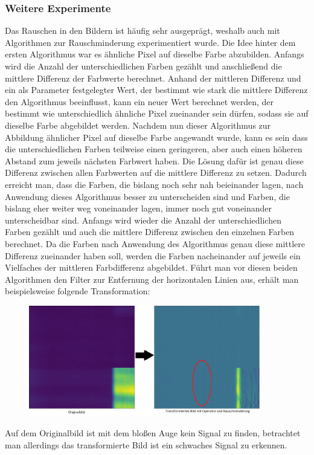 \documentclass[11pt, a4paper]{article}
\begin{document}
\subsubsection{Weitere Experimente}
Das Rauschen in den Bildern ist häufig sehr ausgeprägt, weshalb auch mit Algorithmen zur Rauschminderung experimentiert wurde. Die Idee hinter dem ersten Algorithmus war es ähnliche Pixel auf dieselbe Farbe abzubilden. Anfangs wird die Anzahl der unterschiedlichen Farben gezählt und anschließend die mittlere Differenz der Farbwerte berechnet. Anhand der mittleren Differenz und ein als Parameter festgelegter Wert, der bestimmt wie stark die mittlere Differenz den Algorithmus beeinflusst, kann ein neuer Wert berechnet werden, der bestimmt wie unterschiedlich ähnliche Pixel zueinander sein dürfen, sodass sie auf dieselbe Farbe abgebildet werden. 
\newline
Nachdem nun dieser Algorithmus zur Abbildung ähnlicher Pixel auf dieselbe Farbe angewandt wurde, kann es sein dass die unterschiedlichen Farben teilweise einen geringeren, aber auch einen höheren Abstand zum jeweils nächsten Farbwert haben. Die Lösung dafür ist genau diese Differenz zwischen allen Farbwerten auf die mittlere Differenz zu setzen. Dadurch erreicht man, dass die Farben, die bislang noch sehr nah beieinander lagen, nach Anwendung dieses Algorithmus besser zu unterscheiden sind und Farben, die bislang eher weiter weg voneinander lagen, immer noch gut voneinander unterscheidbar sind. Anfangs wird wieder die Anzahl der unterschiedlichen Farben gezählt und auch die mittlere Differenz zwischen den einzelnen Farben berechnet. Da die Farben nach Anwendung des Algorithmus genau diese mittlere Differenz zueinander haben soll, werden die Farben nacheinander auf jeweils ein Vielfaches der mittleren Farbdifferenz abgebildet.
\newline
Führt man vor diesen beiden Algorithmen den Filter zur Entfernung der horizontalen Linien aus, erhält man beispielsweise folgende Transformation:
\begin{figure}[h]
\centering
\includegraphics[width=0.9\textwidth]{img/original-vs-rauschminderung.png}
\end{figure}
\newline
Auf dem Originalbild ist mit dem bloßen Auge kein Signal zu finden, betrachtet man allerdings das transformierte Bild ist ein schwaches Signal zu erkennen.
\end{document}
